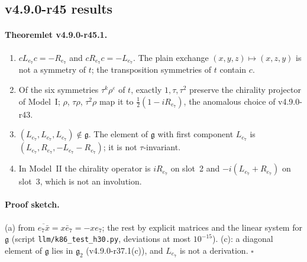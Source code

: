 \subsection*{v4.9.0-r45 results}
\label{subsec:v490-r45-results}

\paragraph{Theoremlet v4.9.0-r45.1.}
\begin{enumerate}[leftmargin=2em]
\item[(a)] \(cL_{e_7}c=-R_{e_7}\) and \(cR_{e_7}c=-L_{e_7}\).  The plain exchange \((x,y,z)\mapsto(x,z,y)\) is not a symmetry of \(t\); the
transposition symmetries of \(t\) contain \(c\).
\item[(b)] Of the six symmetries \(\tau^k\rho^\varepsilon\) of \(t\), exactly \(1,\tau,\tau^2\) preserve the chirality projector of Model~I; \(\rho\),
\(\tau\rho\), \(\tau^2\rho\) map it to \(\tfrac12(1-iR_{e_7})\), the anomalous choice of v4.9.0-r43.
\item[(c)] \((L_{e_7},L_{e_7},L_{e_7})\notin\mathfrak g\).  The element of \(\mathfrak g\) with first component \(L_{e_7}\) is
\((L_{e_7},R_{e_7},-L_{e_7}-R_{e_7})\); it is not \(\tau\)-invariant.
\item[(d)] In Model~II the chirality operator is \(iR_{e_7}\) on slot~2 and \(-i(L_{e_7}+R_{e_7})\) on slot~3, which is not an involution.
\end{enumerate}

\paragraph{Proof sketch.}
(a) from \(\overline{e_7\bar x}=x\bar e_7=-xe_7\); the rest by explicit matrices and the linear system for \(\mathfrak g\) (script
\texttt{llm/k86\_test\_h30.py}, deviations at most \(10^{-15}\)).  (c): a diagonal element of \(\mathfrak g\) lies in \(\mathfrak g_2\)
(v4.9.0-r37.1(c)), and \(L_{e_7}\) is not a derivation.  \(\square\)

